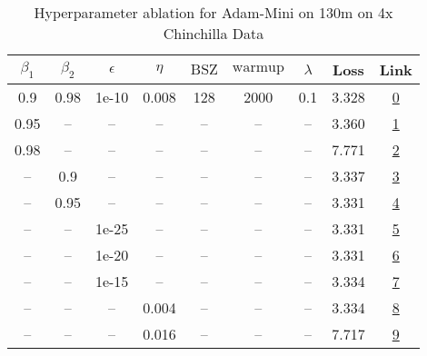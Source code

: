 \begin{table}[H]
\centering
\caption{Hyperparameter ablation for Adam-Mini on 130m on 4x Chinchilla Data}
\label{tab:ablation_adam-mini_130m_4}
\begin{tabular}{ccccccccc}
\toprule
$\beta_1$ & $\beta_2$ & $\epsilon$ & $\eta$ & $\mathrm{BSZ}$ & $\mathrm{warmup}$ & $\lambda$ & Loss & Link \\
\midrule
0.9 & 0.98 & 1e-10 & 0.008 & 128 & 2000 & 0.1 & 3.328 & \href{https://wandb.ai/stanford-mercury/optimizer-scaling/runs/sweep-130m-10B-mini8e0689lr0.008-wd0.1-minlr0-warmup2000-b10.9-b-1de787}{0} \\
\midrule
0.95 & -- & -- & -- & -- & -- & -- & 3.360 & \href{https://wandb.ai/stanford-mercury/optimizer-scaling/runs/sweep-130m-10B-mini5655falr0.008-wd0.1-minlr0-warmup2000-b10.95--7977a5}{1} \\
0.98 & -- & -- & -- & -- & -- & -- & 7.771 & \href{https://wandb.ai/stanford-mercury/optimizer-scaling/runs/sweep-130m-10B-mini608e8clr0.008-wd0.1-minlr0-warmup2000-b10.98--851955}{2} \\
-- & 0.9 & -- & -- & -- & -- & -- & 3.337 & \href{https://wandb.ai/stanford-mercury/optimizer-scaling/runs/sweep-130m-10B-minic61cb4lr0.008-wd0.1-minlr0-warmup2000-b10.9-b-3daee1}{3} \\
-- & 0.95 & -- & -- & -- & -- & -- & 3.331 & \href{https://wandb.ai/stanford-mercury/optimizer-scaling/runs/sweep-130m-10B-minica3b57lr0.008-wd0.1-minlr0-warmup2000-b10.9-b-c56f5e}{4} \\
-- & -- & 1e-25 & -- & -- & -- & -- & 3.331 & \href{https://wandb.ai/stanford-mercury/optimizer-scaling/runs/sweep-130m-10B-mini98f892lr0.008-wd0.1-minlr0-warmup2000-b10.9-b-b90941}{5} \\
-- & -- & 1e-20 & -- & -- & -- & -- & 3.331 & \href{https://wandb.ai/stanford-mercury/optimizer-scaling/runs/sweep-130m-10B-mini3af704lr0.008-wd0.1-minlr0-warmup2000-b10.9-b-522688}{6} \\
-- & -- & 1e-15 & -- & -- & -- & -- & 3.334 & \href{https://wandb.ai/stanford-mercury/optimizer-scaling/runs/sweep-130m-10B-mini99be6blr0.008-wd0.1-minlr0-warmup2000-b10.9-b-c9b783}{7} \\
-- & -- & -- & 0.004 & -- & -- & -- & 3.334 & \href{https://wandb.ai/stanford-mercury/optimizer-scaling/runs/sweep-130m-10B-mini593d31lr0.004-wd0.1-minlr0-warmup2000-b10.9-b-17e1ff}{8} \\
-- & -- & -- & 0.016 & -- & -- & -- & 7.717 & \href{https://wandb.ai/stanford-mercury/optimizer-scaling/runs/sweep-130m-10B-mini76c7dflr0.016-wd0.1-minlr0-warmup2000-b10.9-b-42ab2c}{9} \\

\end{tabular}
\end{table}
